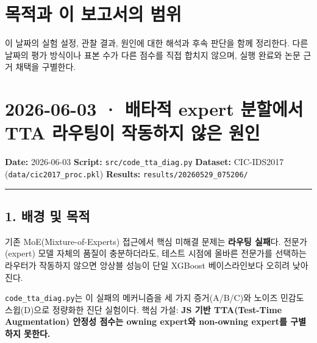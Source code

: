 




\section*{목적과 이 보고서의 범위}

이 날짜의 실험 설정, 관찰 결과, 원인에 대한 해석과 후속 판단을 함께 정리한다. 다른 날짜의 평가 방식이나 표본 수가 다른 점수를 직접 합치지 않으며, 실행 완료와 논문 근거 채택을 구별한다.


\section{2026-06-03 · 배타적 expert 분할에서 TTA 라우팅이 작동하지 않은 원인}
\label{report:20260603_0603}
\textbf{Date:} 2026-06-03 \textbf{Script:} \texttt{src/\allowbreak{}\allowbreak{}code\allowbreak{}\_\allowbreak{}\allowbreak{}tta\_\allowbreak{}\allowbreak{}dia\allowbreak{}g.\allowbreak{}py} \textbf{Dataset:} CIC-IDS2017 (\texttt{data/\allowbreak{}\allowbreak{}cic\allowbreak{}2017\_\allowbreak{}\allowbreak{}pro\allowbreak{}c.\allowbreak{}pkl}) \textbf{Results:} \texttt{results/\allowbreak{}\allowbreak{}20260529\allowbreak{}\_\allowbreak{}\allowbreak{}075206/\allowbreak{}\allowbreak{}}


\medskip\hrule\medskip
\subsection{1. 배경 및 목적}
기존 MoE(Mixture-of-Experts) 접근에서 핵심 미해결 문제는 \textbf{라우팅 실패}다. 전문가(expert) 모델 자체의 품질이 충분하더라도, 테스트 시점에 올바른 전문가를 선택하는 라우터가 작동하지 않으면 앙상블 성능이 단일 XGBoost 베이스라인보다 오히려 낮아진다.

\texttt{code\_\allowbreak{}\allowbreak{}tta\allowbreak{}\_\allowbreak{}\allowbreak{}diag.\allowbreak{}py\allowbreak{}}는 이 실패의 메커니즘을 세 가지 증거(A/\allowbreak{}B/\allowbreak{}C)와 노이즈 민감도 스윕(D)으로 정량화한 진단 실험이다. 핵심 가설: \textbf{JS 기반 TTA(Test-Time Augmentation) 안정성 점수는 owning expert와 non-owning expert를 구별하지 못한다.}


